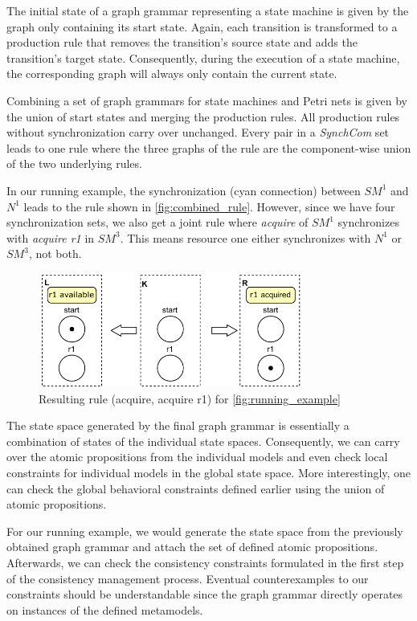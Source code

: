 \documentclass[conference]{IEEEtran}
\begin{document}
The initial state of a graph grammar representing a state machine is given by the graph only containing its start state.
Again, each transition is transformed to a production rule that removes the transition's source state and adds the transition's target state.
Consequently, during the execution of a state machine, the corresponding graph will always only contain the current state.

Combining a set of graph grammars for state machines and Petri nets is given by the union of start states and merging the production rules.
All production rules without synchronization carry over unchanged.
Every pair in a \textit{SynchCom} set leads to one rule where the three graphs of the rule are the component-wise union of the two underlying rules.

In our running example, the synchronization (cyan connection) between $SM^1$ and $N^1$ leads to the rule shown in \autoref{fig:combined_rule}.
However, since we have four synchronization sets, we also get a joint rule where \textit{acquire} of $SM^1$ synchronizes with \textit{acquire r1} in $SM^3$.
This means resource one either synchronizes with $N^1$ or $SM^3$, not both.

\begin{figure}[h]
    \centering
    \includegraphics[width=3.4in]{combined_rule}
    \caption{Resulting rule (acquire, acquire r1) for \autoref{fig:running_example}}
    \label{fig:combined_rule}
\end{figure}

The state space generated by the final graph grammar is essentially a combination of states of the individual state spaces.
Consequently, we can carry over the atomic propositions from the individual models and even check local constraints for individual models in the global state space.
More interestingly, one can check the global behavioral constraints defined earlier using the union of atomic propositions.

For our running example, we would generate the state space from the previously obtained graph grammar and attach the set of defined atomic propositions.
Afterwards, we can check the consistency constraints formulated in the first step of the consistency management process.
Eventual counterexamples to our constraints should be understandable since the graph grammar directly operates on instances of the defined metamodels.
\end{document}
